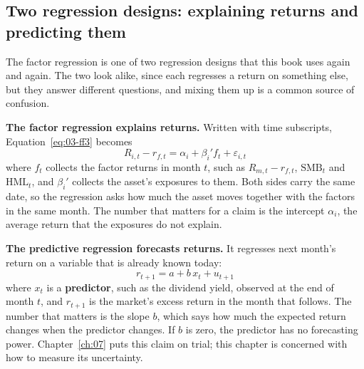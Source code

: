 \subsection{Two regression designs: explaining returns and predicting them}
\label{sec:03-two-designs}

The factor regression is one of two regression designs that this book uses again and again. The two look alike, since each regresses a return on something else, but they answer different questions, and mixing them up is a common source of confusion.

\textbf{The factor regression explains returns.} Written with time subscripts, Equation~\eqref{eq:03-ff3} becomes
\begin{equation}
  R_{i,t} - r_{f,t} = \alpha_i + \beta_i' f_t + \varepsilon_{i,t}
  \label{eq:03-factor-ts}
\end{equation}
where $f_t$ collects the factor returns in month $t$, such as $R_{m,t} - r_{f,t}$, $\mathrm{SMB}_t$ and $\mathrm{HML}_t$, and $\beta_i'$ collects the asset's exposures to them. Both sides carry the same date, so the regression asks how much the asset moves together with the factors in the same month. The number that matters for a claim is the intercept $\alpha_i$, the average return that the exposures do not explain.

\textbf{The predictive regression forecasts returns.} It regresses next month's return on a variable that is already known today:
\begin{equation}
  r_{t+1} = a + b\,x_t + u_{t+1}
  \label{eq:03-predictive}
\end{equation}
where $x_t$ is a \textbf{predictor}, such as the dividend yield, observed at the end of month $t$, and $r_{t+1}$ is the market's excess return in the month that follows. The number that matters is the slope $b$, which says how much the expected return changes when the predictor changes. If $b$ is zero, the predictor has no forecasting power. Chapter~\ref{ch:07} puts this claim on trial; this chapter is concerned with how to measure its uncertainty.

